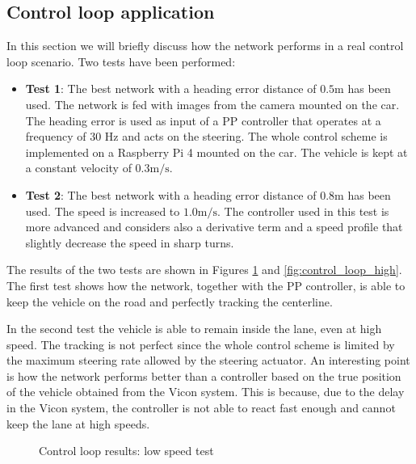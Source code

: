 \documentclass[a4paper,12pt,sort&compress]{article}
\begin{document}
\clearpage





\subsection{Control loop application}
    In this section we will briefly discuss how the network performs in a real control loop
    scenario. Two tests have been performed: 
    \begin{itemize}
        \item \textbf{Test 1}: The best network with a heading error distance of $\num{0.5} \si{\meter}$ has
        been used. The network is fed with images from the camera mounted on the car. The heading
        error is used as input of a PP controller that operates at a frequency of 30 Hz and acts on
        the steering. 
        The whole control scheme is implemented on a Raspberry Pi 4 mounted on the car. The vehicle
        is kept at a constant velocity of $\num{0.3} \si{\meter\per\second}$.
        \item \textbf{Test 2}: The best network with a heading error distance of $\num{0.8}\si{\meter}$  has
        been used. The speed is increased to $\num{1.0} \si{\meter\per\second}$. The controller used
        in this test is more advanced and considers also a derivative term and a speed profile that
        slightly decrease the speed in sharp turns. 
    \end{itemize}

    The results of the two tests are shown in Figures \ref{fig:control_loop_low} and 
    \ref{fig:control_loop_high}.  The first test shows how the network, together with the PP
    controller, is able to keep the vehicle on the road and perfectly tracking the centerline. 

    In the second test the vehicle is able to remain inside the lane, even at high speed. The
    tracking is not perfect since the whole control scheme is limited by the maximum steering rate
    allowed by the steering actuator. An interesting point is how the network performs better than a
    controller based on the true position of the vehicle obtained from the Vicon system. This is
    because, due to the delay in the Vicon system, the controller is not able to react fast enough
    and cannot keep the lane at high speeds.

    \begin{figure}
        \centering
        \caption{Control loop results: low speed test}
        \label{fig:control_loop_low}
    \end{figure}
\end{document}
